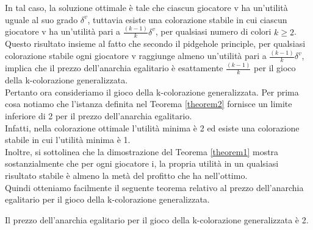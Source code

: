 In tal caso, la soluzione ottimale è tale che ciascun giocatore v ha un'utilità uguale al suo grado \(\delta^v\), tuttavia esiste una colorazione stabile in cui ciascun giocatore v ha un'utilità pari a \(\frac{(k-1)}{k} \delta^v\), per qualsiasi numero di colori \(k \geq 2\).\\

Questo risultato insieme al fatto che secondo il pidgehole principle, per qualsiasi colorazione stabile ogni giocatore v raggiunge almeno un'utilità pari a \(\frac{(k-1)}{k} \delta^v\), implica che il prezzo dell'anarchia egalitario è esattamente \(\frac{(k-1)}{k}\) per il gioco della k-colorazione generalizzata.\\

Pertanto ora consideriamo il gioco della k-colorazione generalizzata. Per prima cosa notiamo che l'istanza definita nel Teorema \ref{theorem2} fornisce un limite inferiore di 2 per il prezzo dell'anarchia egalitario.\\

Infatti, nella colorazione ottimale l'utilità minima è 2 ed esiste una colorazione stabile in cui l'utilità minima è 1.\\

Inoltre, si sottolinea che la dimostrazione del Teorema \ref{theorem1} mostra sostanzialmente che per ogni giocatore i, la propria utilità in un qualsiasi risultato stabile è almeno la metà del profitto che ha nell'ottimo.\\

Quindi otteniamo facilmente il seguente teorema relativo al prezzo dell'anarchia egalitario per il gioco della k-colorazione generalizzata.

\begin{theorem}
\label{theorem3}
	Il prezzo dell'anarchia egalitario per il gioco della k-colorazione generalizzata è 2.
\end{theorem}